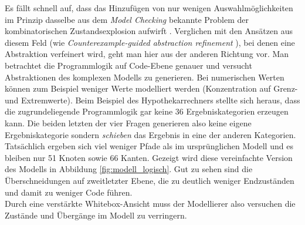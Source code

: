 Es fällt schnell auf, dass das Hinzufügen von nur wenigen Auswahlmöglichkeiten im Prinzip dasselbe aus dem \textit{Model Checking} bekannte Problem der kombinatorischen Zustandsexplosion aufwirft \cite{clarke_model_2012}. Verglichen mit den Ansätzen aus diesem Feld (wie \textit{Counterexample-guided abstraction refinement} \cite{clarke_counterexample-guided_2000}), bei denen eine Abstraktion verfeinert wird, geht man hier aus der anderen Richtung vor. Man betrachtet die Programmlogik auf Code-Ebene genauer und versucht Abstraktionen des komplexen Modells zu generieren. Bei numerischen Werten können zum Beispiel weniger Werte modelliert werden (Konzentration auf Grenz- und Extremwerte). Beim Beispiel des Hypothekarrechners stellte sich heraus, dass die zugrundeliegende Programmlogik gar keine 36 Ergebniskategorien erzeugen kann. Die beiden letzten der vier Fragen generieren also keine eigene Ergebniskategorie sondern \textit{schieben} das Ergebnis in eine der anderen Kategorien. Tatsächlich ergeben sich viel weniger Pfade als im ursprünglichen Modell und es bleiben nur 51 Knoten sowie 66 Kanten. Gezeigt wird diese vereinfachte Version des Modells in Abbildung \ref{fig:modell_logisch}. Gut zu sehen sind die Überschneidungen auf zweitletzter Ebene, die zu deutlich weniger Endzuständen und damit zu weniger Code führen.\\
Durch eine verstärkte Whitebox-Ansicht muss der Modellierer also versuchen die Zustände und Übergänge im Modell zu verringern.



